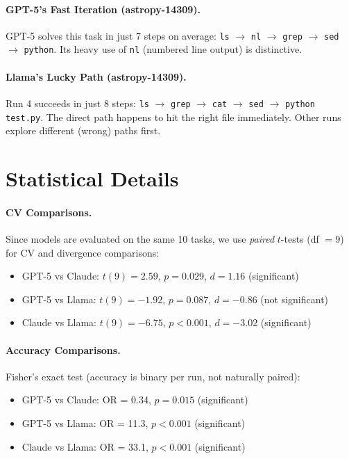 \documentclass{article}
\begin{document}
\paragraph{GPT-5's Fast Iteration (astropy-14309).} GPT-5 solves this task in just 7 steps on average: \texttt{ls} $\rightarrow$ \texttt{nl} $\rightarrow$ \texttt{grep} $\rightarrow$ \texttt{sed} $\rightarrow$ \texttt{python}. Its heavy use of \texttt{nl} (numbered line output) is distinctive.

\paragraph{Llama's Lucky Path (astropy-14309).} Run 4 succeeds in just 8 steps: \texttt{ls} $\rightarrow$ \texttt{grep} $\rightarrow$ \texttt{cat} $\rightarrow$ \texttt{sed} $\rightarrow$ \texttt{python test.py}. The direct path happens to hit the right file immediately. Other runs explore different (wrong) paths first.

\section{Statistical Details}
\label{app:stats}

\paragraph{CV Comparisons.} Since models are evaluated on the same 10 tasks, we use \textit{paired} $t$-tests (df $= 9$) for CV and divergence comparisons:
\begin{itemize}
    \item GPT-5 vs Claude: $t(9) = 2.59$, $p = 0.029$, $d = 1.16$ (significant)
    \item GPT-5 vs Llama: $t(9) = -1.92$, $p = 0.087$, $d = -0.86$ (not significant)
    \item Claude vs Llama: $t(9) = -6.75$, $p < 0.001$, $d = -3.02$ (significant)
\end{itemize}

\paragraph{Accuracy Comparisons.} Fisher's exact test (accuracy is binary per run, not naturally paired):
\begin{itemize}
    \item GPT-5 vs Claude: OR = 0.34, $p = 0.015$ (significant)
    \item GPT-5 vs Llama: OR = 11.3, $p < 0.001$ (significant)
    \item Claude vs Llama: OR = 33.1, $p < 0.001$ (significant)
\end{itemize}
\end{document}
